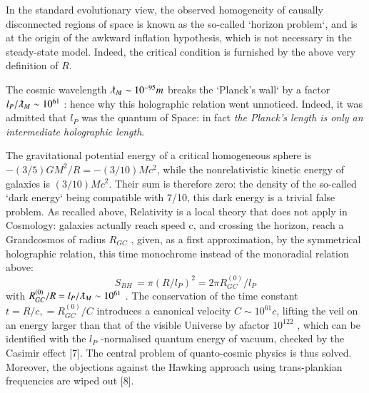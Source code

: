 \documentclass[twoside,draft]{article}
\begin{document}
\begin{sloppypar}
{In the standard evolutionary view, the observed homogeneity of causally disconnected regions
of space is known as the so-called `horizon problem`, and is at the origin of the awkward inflation
hypothesis, which is not necessary in the steady-state model. Indeed, the critical condition is
furnished by the above very definition of $R$.

The cosmic wavelength
$\lambdabar_{M}\sim 10^{-95} m$ breaks the `Planck's wall` by a factor $l_{P}/\lambdabar_{M}\sim 10^{61}$ : hence why this holographic relation went unnoticed. Indeed, it was admitted that $l_{P}$ was the quantum of Space: in fact \textit{the Planck's length is only an intermediate holographic length}.

The gravitational potential energy of a critical homogeneous sphere is $-(3/5)GM^{2}/R = -
(3/10)Mc^{2}$, while the nonrelativistic kinetic energy of galaxies is $(3/10)Mc^{2}$. Their sum is therefore
zero: the density of the so-called `dark energy` being compatible with 7/10, this dark energy is a
trivial false problem. As recalled above, Relativity is a local theory that does not apply in
Cosmology: galaxies actually reach speed c, and crossing the horizon, reach a Grandcosmos of
radius $R_{GC}$ , given, as a first approximation, by the symmetrical holographic relation, this time
monochrome instead of the monoradial relation above:
\begin{equation}
S_{BH}\, = \pi(R/l_P )^{2} = 2\pi R^{(0)}_{GC} /l_{P}
\end{equation}
with $R^{(0)}_{GC} /R = l_{P} /\lambdabar_{M} \sim 10^{61}$ . The conservation of the time constant $t = R/c, = R^{(0)}_{GC} /C$ introduces a canonical velocity $C \sim 10^{61} c$, lifting the veil on an energy larger than that of the visible Universe by afactor $10^{122}$ , which can be identified with the $l_{P}$ -normalised quantum energy of vacuum, checked by
the Casimir effect [7]. The central problem of quanto-cosmic physics is thus solved. Moreover, the
objections against the Hawking approach using trans-plankian frequencies are wiped out [8].

}
\end{sloppypar}
\end{document}
